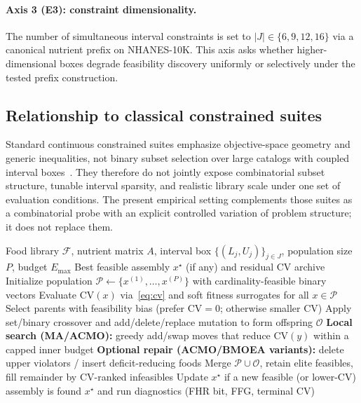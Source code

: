 \documentclass[lettersize,journal]{IEEEtran}
\begin{document}
\paragraph{Axis 3 (E3): constraint dimensionality.}
The number of simultaneous interval constraints is set to $|J|\in\{6,9,12,16\}$ via a canonical nutrient prefix on NHANES-10K.
This axis asks whether higher-dimensional boxes degrade feasibility discovery uniformly or selectively under the tested prefix construction.

\subsection{Relationship to classical constrained suites}
Standard continuous constrained suites emphasize objective-space geometry and generic inequalities, not binary subset selection over large catalogs with coupled interval boxes~\cite{deb2002,zhang2007,cheng2016}.
They therefore do not jointly expose combinatorial subset structure, tunable interval sparsity, and realistic library scale under one set of evaluation conditions.
The present empirical setting complements those suites as a combinatorial probe with an explicit controlled variation of problem structure; it does not replace them.

\begin{algorithm*}[!t]
\caption{Feasibility-biased memetic EA template covering MA, ACMO-Diet, and BMOEA under the unified empirical decode.}
\label{alg:memetic}
\begin{algorithmic}[1]
\Require Food library $\mathcal{F}$, nutrient matrix $A$, interval box $\{(L_j,U_j)\}_{j\in J}$, population size $P$, budget $E_{\max}$
\Ensure Best feasible assembly $x^\star$ (if any) and residual $\mathrm{CV}$ archive
\State Initialize population $\mathcal{P}\leftarrow\{x^{(1)},\ldots,x^{(P)}\}$ with cardinality-feasible binary vectors
\State Evaluate $\mathrm{CV}(x)$ via~\eqref{eq:cv} and soft fitness surrogates for all $x\in\mathcal{P}$
  \State Select parents with feasibility bias (prefer $\mathrm{CV}=0$; otherwise smaller $\mathrm{CV}$)
  \State Apply set/binary crossover and add/delete/replace mutation to form offspring $\mathcal{O}$
    \State \textbf{Local search (MA/ACMO):} greedy add/swap moves that reduce $\mathrm{CV}(y)$ within a capped inner budget
    \State \textbf{Optional repair (ACMO/BMOEA variants):} delete upper violators / insert deficit-reducing foods
  \EndFor
  \State Merge $\mathcal{P}\cup\mathcal{O}$, retain elite feasibles, fill remainder by $\mathrm{CV}$-ranked infeasibles
  \State Update $x^\star$ if a new feasible (or lower-$\mathrm{CV}$) assembly is found
\EndWhile
\State \Return $x^\star$ and run diagnostics (FHR bit, FFG, terminal $\mathrm{CV}$)
\end{algorithmic}
\end{algorithm*}
\end{document}
